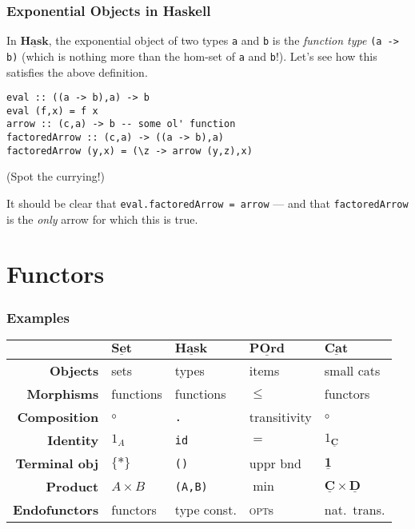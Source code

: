 \documentclass[10pt]{beamer}
\newcommand{\Cat}[1]{\ensuremath{\underline{\mathbf{#1}}}}
\theoremstyle{definition}
\theoremstyle{remark}
\numberwithin{equation}{section}
\begin{document}
\begin{frame}
  \frametitle{Exponential Objects in Haskell}

  In $\Cat{Hask}$, the exponential object of two types \lstinline{a} and
  \lstinline{b} is the \emph{function type} \lstinline{(a -> b)} (which is
  nothing more than the hom-set of \lstinline{a} and \lstinline{b}!). Let's see
  how this satisfies the above definition.

\begin{lstlisting}[frame=single]
eval :: ((a -> b),a) -> b
eval (f,x) = f x
arrow :: (c,a) -> b -- some ol' function
factoredArrow :: (c,a) -> ((a -> b),a)
factoredArrow (y,x) = (\z -> arrow (y,z),x)
\end{lstlisting}
  {\footnotesize{(Spot the currying!)}}

  It should be clear that \lstinline{eval.factoredArrow = arrow} --- and that
  \lstinline{factoredArrow} is the \emph{only} arrow for which this is true.
\end{frame}

\section{Functors}

\begin{frame}[fragile]
  \frametitle{Examples}
  \begin{tabular}{r l l l l}\toprule
    & $\Cat{Set}$ & $\Cat{Hask}$ & $\Cat{POrd}$ & $\Cat{Cat}$ \\\midrule
    \textbf{Objects} & sets & types & items & small cats \\
    \textbf{Morphisms} & functions & functions & $\leq$ & functors \\
    \textbf{Composition} & $\circ$ & \texttt{.} & transitivity & $\circ$ \\
    \textbf{Identity} & $1_A$ & \texttt{id} & $=$ & $1_{\Cat{C}}$ \\
    \textbf{Terminal obj\rlap{.}} & $\{*\}$ & \texttt{()} & uppr bnd & $\Cat{1}$ \\
    \textbf{Product} & $A \times B$ & \texttt{(A,B)} & $\min$ & $\Cat{C} \times \Cat{D}$ \\
    \textbf{Endofunctors} & functors & type const. & \textsc{opt}s & nat.\ trans.\\\bottomrule
  \end{tabular}
\end{frame}
\end{document}

